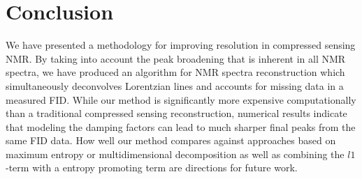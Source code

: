 \documentclass[11pt]{article}
\begin{document}
\section{Conclusion}
We have presented a methodology for improving resolution in compressed sensing NMR. By taking into account the peak broadening that is inherent in all NMR spectra, we have produced an algorithm for NMR spectra reconstruction which simultaneously deconvolves Lorentzian lines and accounts for missing data in a measured FID. While our method is significantly more expensive computationally than a traditional compressed sensing reconstruction, numerical results indicate that modeling the damping factors can lead to much sharper final peaks from the same FID data. How well our method compares against approaches based on maximum entropy or multidimensional decomposition as well as combining the $l1$-term with a entropy promoting term are directions for future work.






%

\end{document}
